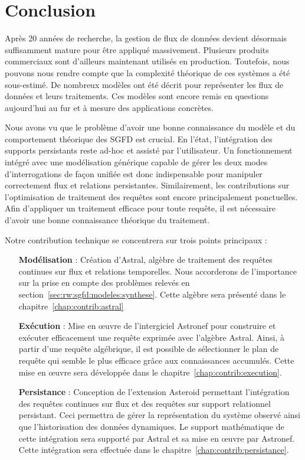 \section{Conclusion}
Après 20 années de recherche, la gestion de flux de données devient désormais suffisamment mature pour être appliqué massivement. Plusieurs produits commerciaux sont d'ailleurs maintenant utilisés en production. Toutefois, nous pouvons nous rendre compte que la complexité théorique de ces systèmes a été sous-estimé. De nombreux modèles ont été décrit pour représenter les flux de données et leurs traitements. Ces modèles sont encore remis en questions aujourd'hui au fur et à mesure des applications concrètes. 

Nous avons vu que le problème d'avoir une bonne connaissance du modèle et du comportement théorique des SGFD est crucial. En l'état, l'intégration des supports persistants reste ad-hoc et assisté par l'utilisateur. Un fonctionnement intégré avec une modélisation générique capable de gérer les deux modes d'interrogations de façon unifiée est donc indispensable pour manipuler correctement flux et relations persistantes. Similairement, les contributions sur l'optimisation de traitement des requêtes sont encore principalement ponctuelles. Afin d'appliquer un traitement efficace pour toute requête, il est nécessaire d'avoir une bonne connaissance théorique du traitement.

Notre contribution technique se concentrera sur trois points principaux :
\begin{itemize}
 \item[\textbf{Modélisation}] : Création d'Astral, algèbre de traitement des requêtes continues sur flux et relations temporelles. Nous accorderons de l'importance sur la prise en compte des problèmes relevés en section~\ref{sec:rw:sgfd:modeles:synthese}. Cette algèbre sera présenté dans le chapitre~\ref{chap:contrib:astral}
 \item[\textbf{Exécution}] : Mise en œuvre de l'intergiciel Astronef pour construire et exécuter efficacement une requête exprimée avec l'algèbre Astral. Ainsi, à partir d'une requête algébrique, il est possible de sélectionner le plan de requête qui semble le plus efficace grâce aux connaissances accumulés. Cette mise en œuvre sera développée dans le chapitre~\ref{chap:contrib:execution}.
 \item[\textbf{Persistance}] : Conception de l'extension Asteroid permettant l'intégration des requêtes continues sur flux et des requêtes sur support relationnel persistant. Ceci permettra de gérer la représentation du système observé ainsi que l'historisation des données dynamiques. Le support mathématique de cette intégration sera supporté par Astral et sa mise en œuvre par Astronef. Cette intégration sera effectuée dans le chapitre~\ref{chap:contrib:persistance}.
\end{itemize}

